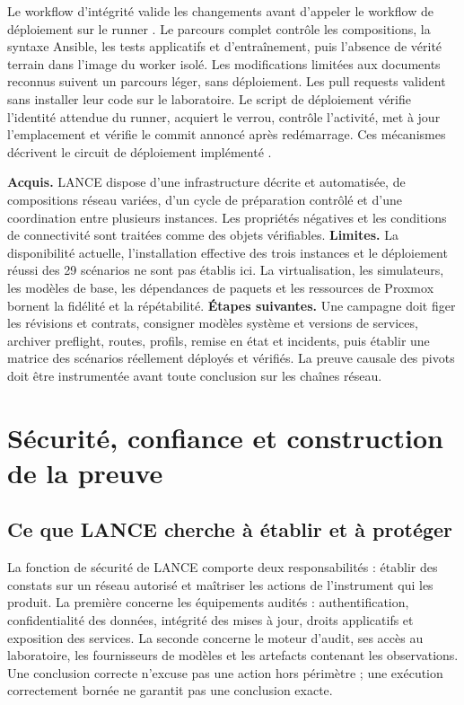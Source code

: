 \documentclass[11pt,a4paper]{article}
\DeclareRobustCommand{\code}[1]{{\small\path{#1}}}
\begin{document}
Le workflow d'intégrité valide les changements avant d'appeler le workflow de
déploiement sur le runner \code{nato-master}. Le parcours complet contrôle les
compositions, la syntaxe Ansible, les tests applicatifs et d'entraînement, puis
l'absence de vérité terrain dans l'image du worker isolé. Les modifications
limitées aux documents reconnus suivent un parcours léger, sans déploiement.
Les pull requests valident sans installer leur code sur le laboratoire. Le
script de déploiement vérifie l'identité attendue du runner, acquiert le verrou,
contrôle l'activité, met à jour l'emplacement et vérifie le commit annoncé
après redémarrage. Ces mécanismes décrivent le circuit de déploiement implémenté
\cite{net-ci,net-update,net-instances}.

\textbf{Acquis.} LANCE dispose d'une infrastructure décrite et automatisée,
de compositions réseau variées, d'un cycle de préparation contrôlé et d'une
coordination entre plusieurs instances. Les propriétés négatives et les
conditions de connectivité sont traitées comme des objets vérifiables.
\textbf{Limites.} La disponibilité actuelle, l'installation effective des trois
instances et le déploiement réussi des 29 scénarios ne sont pas établis ici.
La virtualisation, les simulateurs, les modèles de base, les dépendances de
paquets et les ressources de Proxmox bornent la fidélité et la répétabilité.
\textbf{Étapes suivantes.} Une campagne doit figer les révisions et contrats,
consigner modèles système et versions de services, archiver preflight, routes,
profils, remise en état et incidents, puis établir une matrice des scénarios
réellement déployés et vérifiés. La preuve causale des pivots doit être
instrumentée avant toute conclusion sur les chaînes réseau.


\section{Sécurité, confiance et construction de la preuve}
\label{sec:securite}

\subsection{Ce que LANCE cherche à établir et à protéger}

La fonction de sécurité de LANCE comporte deux responsabilités : établir des
constats sur un réseau autorisé et maîtriser les actions de l'instrument qui
les produit. La première concerne les équipements audités : authentification,
confidentialité des données, intégrité des mises à jour, droits applicatifs et
exposition des services. La seconde concerne le moteur d'audit, ses accès au
laboratoire, les fournisseurs de modèles et les artefacts contenant les
observations. Une conclusion correcte n'excuse pas une action hors périmètre ;
une exécution correctement bornée ne garantit pas une conclusion exacte.
\end{document}
